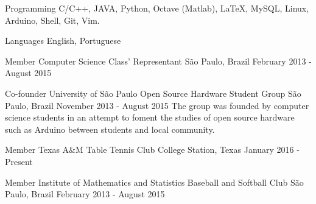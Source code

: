 \documentclass[11pt, a4paper]{awesome-cv-res}
\begin{document}
\begin{cvskills}
\cvskill
{Programming} %
{C/C++, JAVA, Python, Octave (Matlab), LaTeX, MySQL, Linux, Arduino, Shell, Git, Vim.} %

\cvskill
{Languages} %
{English, Portuguese} %

\end{cvskills}

\begin{cventries}

\cventry
{Member}
{Computer Science Class' Representant}
{São Paulo, Brazil}
{February 2013 - August 2015}
{}

\cventry
{Co-founder}
{University of São Paulo Open Source Hardware Student Group}
{São Paulo, Brazil}
{November 2013 - August 2015}
{The group was founded by computer science students in an attempt to foment the studies of open source hardware such as Arduino between students and local community.}
\newline
\newline

\cventry
{Member}
{Texas A\&M Table Tennis Club}
{College Station, Texas}
{January 2016 - Present}
{}

\cventry
{Member}
{Institute of Mathematics and Statistics Baseball and Softball Club}
{São Paulo, Brazil}
{February 2013 - August 2015}
{}




\end{cventries}
\end{document}
